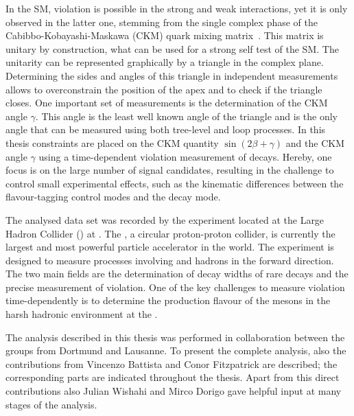 In the \ac{SM}, \CP violation is possible in the strong and weak interactions, yet it is only observed in the latter one, stemming from the single complex phase of the Cabibbo-Kobayashi-Maskawa (CKM) quark mixing matrix~\cite{Kobayashi:1973fv}.
This matrix is unitary by construction, what can be used for a strong self test of the \ac{SM}.
The unitarity can be represented graphically by a triangle in the complex plane.
Determining the sides and angles of this triangle in independent measurements allows to overconstrain the position of the apex and to check if the triangle closes.
One important set of measurements is the determination of the CKM angle $\gamma$.
This angle is the least well known angle of the triangle and is the only angle that can be measured using both tree-level and loop processes.
In this thesis constraints are placed on the CKM quantity $\sin\!\left(2\beta+\gamma\right)$ and the CKM angle $\gamma$ using a time-dependent \CP violation measurement of \BdToDpi decays.
Hereby, one focus is on the large number of signal candidates, resulting in the challenge to control small experimental effects, such as the kinematic differences between the flavour-tagging control modes and the \BdToDpi decay mode.

The analysed data set was recorded by the \lhcb experiment located at the Large Hadron Collider (\lhc) at \cern.
The \lhc, a circular proton-proton collider, is currently the largest and most powerful particle accelerator in the world.
The \lhcb experiment is designed to measure processes involving \bquark and \cquark hadrons in the forward direction.
The two main fields are the determination of decay widths of rare \B decays and the precise measurement of \CP violation.
One of the key challenges to measure \CP violation time-dependently is to determine the production flavour of the \B mesons in the harsh hadronic environment at the \lhc.

The analysis described in this thesis was performed in collaboration between the \lhcb groups from Dortmund and Lausanne.
To present the complete analysis, also the contributions from Vincenzo Battista and Conor Fitzpatrick are described; the corresponding parts are indicated throughout the thesis.
Apart from this direct contributions also Julian Wishahi and Mirco Dorigo gave helpful input at many stages of the analysis.

